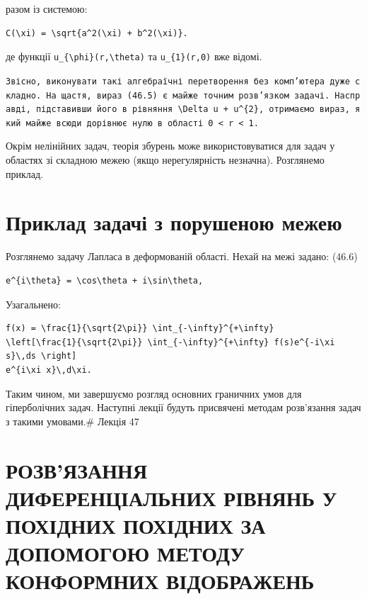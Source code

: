 \documentclass[
  ukrainian,
]{article}
\begin{document}
разом із системою:

\begin{verbatim}
C(\xi) = \sqrt{a^2(\xi) + b^2(\xi)}.
\end{verbatim}

де функції \texttt{u\_\{\textbackslash{}phi\}(r,\textbackslash{}theta)}
та \texttt{u\_\{1\}(r,0)} вже відомі.

\texttt{Звісно,\ виконувати\ такі\ алгебраїчні\ перетворення\ без\ комп’ютера\ дуже\ складно.\ На\ щастя,\ вираз\ (46.5)\ є\ майже\ точним\ розв’язком\ задачі.\ Насправді,\ підставивши\ його\ в\ рівняння\ \textquotesingle{}\textbackslash{}Delta\ u\ +\ u\^{}\{2\}\textquotesingle{},\ отримаємо\ вираз,\ який\ майже\ всюди\ дорівнює\ нулю\ в\ області\ \textquotesingle{}0\ \textless{}\ r\ \textless{}\ 1\textquotesingle{}.}

Окрім нелінійних задач, теорія збурень може використовуватися для задач
у областях зі складною межею (якщо нерегулярність незначна). Розглянемо
приклад.

\section{Приклад задачі з порушеною
межею}\label{ux43fux440ux438ux43aux43bux430ux434-ux437ux430ux434ux430ux447ux456-ux437-ux43fux43eux440ux443ux448ux435ux43dux43eux44e-ux43cux435ux436ux435ux44e}

Розглянемо задачу Лапласа в деформованій області. Нехай на межі задано:
(46.6)

\begin{verbatim}
e^{i\theta} = \cos\theta + i\sin\theta,
\end{verbatim}

Узагальнено:

\begin{verbatim}
f(x) = \frac{1}{\sqrt{2\pi}} \int_{-\infty}^{+\infty}
\left[\frac{1}{\sqrt{2\pi}} \int_{-\infty}^{+\infty} f(s)e^{-i\xi s}\,ds \right]
e^{i\xi x}\,d\xi.
\end{verbatim}

Таким чином, ми завершуємо розгляд основних граничних умов для
гіперболічних задач. Наступні лекції будуть присвячені методам
розв'язання задач з такими умовами.\# Лекція 47

\section{РОЗВ'ЯЗАННЯ ДИФЕРЕНЦІАЛЬНИХ РІВНЯНЬ У ПОХІДНИХ ПОХІДНИХ ЗА
ДОПОМОГОЮ МЕТОДУ КОНФОРМНИХ
ВІДОБРАЖЕНЬ}\label{ux440ux43eux437ux432ux44fux437ux430ux43dux43dux44f-ux434ux438ux444ux435ux440ux435ux43dux446ux456ux430ux43bux44cux43dux438ux445-ux440ux456ux432ux43dux44fux43dux44c-ux443-ux43fux43eux445ux456ux434ux43dux438ux445-ux43fux43eux445ux456ux434ux43dux438ux445-ux437ux430-ux434ux43eux43fux43eux43cux43eux433ux43eux44e-ux43cux435ux442ux43eux434ux443-ux43aux43eux43dux444ux43eux440ux43cux43dux438ux445-ux432ux456ux434ux43eux431ux440ux430ux436ux435ux43dux44c}
\end{document}
